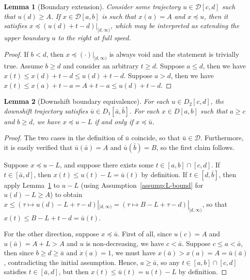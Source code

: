 \documentclass[a4paper]{report}
\theoremstyle{definition}
\theoremstyle{plain}
\newtheorem{lemma}{Lemma}[chapter]
\newcommand\halfopen[2]{\ensuremath{[#1,#2)}}
\begin{document}
\begin{lemma}[Boundary extension]\label{lemma:boundary-extension}
  Consider some trajectory $u \in \mathcal{D}[c,d]$ such that $u(d) \geq A$. If
  $x \in \mathcal{D}[a,b]$ is such that $x(a) = A$ and $x \preceq u$, then it
  satisfies $x \preceq (u(d) + t - d)|_{\halfopen{d}{\infty}}$, which may be
  interpreted as extending the upper boundary $u$ to the right at full speed.
\end{lemma}
\begin{proof}
  If $b < d$, then $x \preceq (\cdot)|_{\halfopen{d}{\infty}}$ is always void and
  the statement is trivially true. Assume $b \geq d$ and consider an arbitrary
  $t \geq d$.
  Suppose $a \leq d$, then we have $x(t) \leq x(d) + t - d \leq u(d) + t - d$.
  Suppose $a > d$, then we have $x(t) \leq x(a) + t - a = A + t - a \leq u(d) + t - d$.
\end{proof}
\begin{lemma}[Downshift boundary equivalence]\label{lemma:downshift}
  For each $u \in D_{2}[c,d]$, the downshift trajectory satisfies
  $\bar{u} \in D_{1}[\bar{a},\bar{b}]$.
  For each $x \in D[a, b]$ such that $a \geq c$ and $b \geq d$, we have
  $x \preceq u - L$ if and only if $x \preceq \bar{u}$.
\end{lemma}
\begin{proof}
  The two cases in the definition of $\bar{u}$ coincide, so that
  $\bar{u} \in \mathcal{D}$. Furthermore, it is easily verified that
  $\bar{u}(\bar{a}) = A$ and $\bar{u}(\bar{b}) = B$, so the first claim
  follows.

  Suppose $x \preceq u - L$, and suppose there exists some
  $t \in [a,b] \cap [c,d]$. If $t \in [\bar{a}, d]$, then
  $x(t) \leq u(t) - L = \bar{u}(t)$ by definition. If $t \in [d, \bar{b}]$, then
  apply Lemma~\ref{lemma:boundary-extension} to $u - L$ (using
  Assumption~\ref{assump:L-bound} for $u(d) - L \geq A$) to obtain
  $x \leq (\tau \mapsto u(d) - L + \tau - d)|_{\halfopen{d}{\infty}} = (\tau \mapsto B - L + \tau - d)|_{\halfopen{d}{\infty}}$,
  so that $x(t) \leq B - L + t - d = \bar{u}(t)$.

  For the other direction, suppose $x \preceq \bar{u}$. First of all, since
  $u(c) = A$ and $u(\bar{a}) = A+L > A$ and $u$ is non-decreasing, we have
  $c < \bar{a}$.
  Suppose $c \leq a < \bar{a}$, then since $b \geq d \geq \bar{a}$ and
  $\dot{x}(a) = 1$, we must have
  $x(\bar{a}) > x(a) = A = \bar{u}(\bar{a})$, contradicting the initial
  assumption.
  Hence, $a \geq \bar{a}$, so any $t \in [a,b] \cap [c,d]$ satisfies
  $t \in [\bar{a}, d]$, but then $x(t) \leq \bar{u}(t) = u(t) - L$ by
  definition.
\end{proof}
\end{document}
